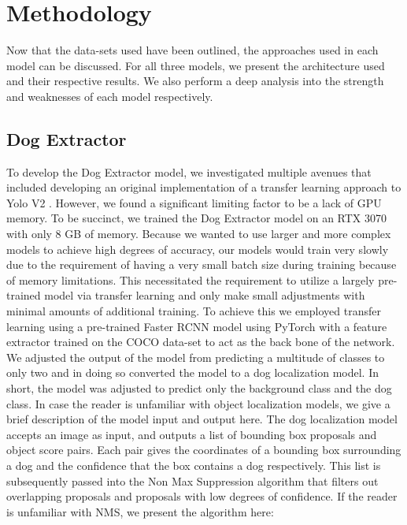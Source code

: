 \documentclass{article}
\begin{document}
\section{Methodology}
Now that the data-sets used have been outlined, the approaches used in each model can be discussed.  For all three models, we present the architecture used and their respective results.  We also perform a deep analysis into the strength and weaknesses of each model respectively.  

\subsection{Dog Extractor}

To develop the Dog Extractor model, we investigated multiple avenues that included developing an original implementation of a transfer learning approach to Yolo V2 \cite{RedmonJoseph2016YBFS}.  However, we found a significant limiting factor to be a lack of GPU memory.  To be succinct, we trained the Dog Extractor model on an RTX 3070 with only 8 GB of memory.  Because we wanted to use larger and more complex models to achieve high degrees of accuracy, our models would train very slowly due to the requirement of having a very small batch size during training because of memory limitations.  This necessitated the requirement to utilize a largely pre-trained model via transfer learning and only make small adjustments with minimal amounts of additional training.  To achieve this we employed transfer learning using a pre-trained Faster RCNN \cite{DBLP:journals/corr/RenHG015} model using PyTorch with a feature extractor trained on the COCO data-set \cite{coco} to act as the back bone of the network.  We adjusted the output of the model from predicting a multitude of classes to only two and in doing so converted the model to a dog localization model.  In short, the model was adjusted to predict only the background class and the dog class.  In case the reader is unfamiliar with object localization models, we give a brief description of the model input and output here.  The dog localization model accepts an image as input, and outputs a list of bounding box proposals and object score pairs.  Each pair gives the coordinates of a bounding box surrounding a dog and the confidence that the box contains a dog respectively.  This list is subsequently passed into the Non Max Suppression algorithm \cite{nms} that filters out overlapping proposals and proposals with low degrees of confidence.  If the reader is unfamiliar with NMS, we present the algorithm here: \\
\end{document}
